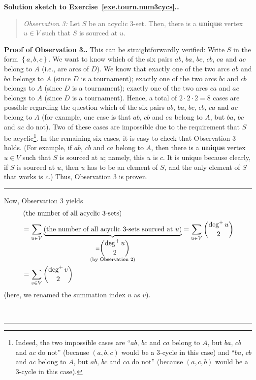 \documentclass[numbers=enddot,12pt,final,onecolumn,notitlepage]{scrartcl}%
\theoremstyle{definition}
\newenvironment{statement}{\begin{quote}}{\end{quote}}
\newenvironment{proof}[1][Proof]{\noindent\textbf{#1.} }{\ \rule{0.5em}{0.5em}}
\let\sumnonlimits\sum
\renewcommand{\sum}{\sumnonlimits\limits}
\newcommand{\set}[1]{\left\{ #1 \right\}}
\newcommand{\tup}[1]{\left( #1 \right)}
\newcommand{\underbrack}[2]{\underbrace{#1}_{\substack{#2}}}
\begin{document}
\begin{proof}[Solution sketch to Exercise~\ref{exe.tourn.num3cycs}.]
\begin{statement}
\textit{Observation 3:} Let $S$ be an acyclic 3-set. Then, there is
a \textbf{unique} vertex $u \in V$ such that $S$ is sourced at $u$.
\end{statement}
\begin{proof}[Proof of Observation 3.]
This can be straightforwardly verified: Write $S$ in the form
$\set{a, b, c}$. We want to know which of the six pairs $ab$, $ba$,
$bc$, $cb$, $ca$ and $ac$ belong to $A$ (i.e., are arcs of $D$).
We know that
exactly one of the two arcs $ab$ and $ba$
belongs to $A$ (since $D$ is a tournament);
exactly one of the two arcs $bc$ and $cb$
belongs to $A$ (since $D$ is a tournament);
exactly one of the two arcs $ca$ and $ac$
belongs to $A$ (since $D$ is a tournament).
Hence, a total of $2\cdot 2\cdot 2 = 8$ cases are possible
regarding the question which of the six pairs $ab$, $ba$,
$bc$, $cb$, $ca$ and $ac$ belong to $A$
(for example, one case is that $ab$, $cb$ and $ca$ belong to $A$, but
$ba$, $bc$ and $ac$ do not). Two of these cases are impossible due to
the requirement that $S$ be acyclic\footnote{Indeed, the two
impossible cases are ``$ab$, $bc$ and $ca$ belong to $A$, but $ba$,
$cb$ and $ac$ do not'' (because $\tup{a, b, c}$ would be a
$3$-cycle in this case) and
``$ba$, $cb$ and $ac$ belong to $A$, but $ab$, $bc$ and $ca$ do not''
(because $\tup{a, c, b}$ would be a $3$-cycle in this case).}. In the
remaining six cases, it is easy to check that Observation 3 holds.
(For example, if $ab$, $cb$ and $ca$ belong to $A$, then there is a
\textbf{unique} vertex $u \in V$ such that $S$ is sourced at $u$;
namely, this $u$ is $c$. It is unique because clearly, if $S$ is
sourced at $u$, then $u$ has to be an element of $S$, and the only
element of $S$ that works is $c$.) Thus, Observation 3 is proven.
\end{proof}

Now, Observation 3 yields
\begin{align}
& \tup{\text{the number of all acyclic 3-sets}} \nonumber \\
&= \sum_{u \in V}
     \underbrack{\tup{
                 \text{the number of all acyclic 3-sets sourced at }
                 u}}{
                     = \dbinom{\deg^+ u}{2} \\
                     \text{(by Observation 2)}
                    }
 = \sum_{u \in V} \dbinom{\deg^+ u}{2}
  \nonumber \\
&= \sum_{v \in V} \dbinom{\deg^+ v}{2}
\label{sol.tourn.num3cycs.1}
\end{align}
(here, we renamed the summation index $u$ as $v$).


\end{proof}
\end{document}
